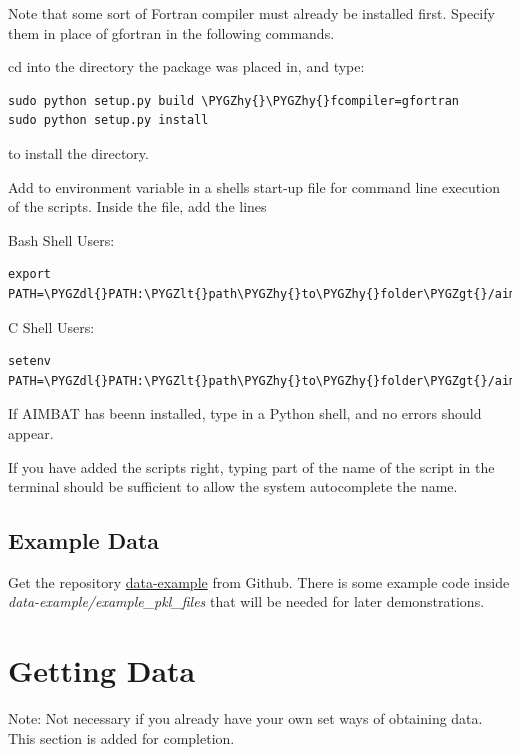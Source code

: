 \documentclass[letterpaper,10pt,english]{sphinxmanual}
\def\PYGZlt{\char`\<}
\def\PYGZgt{\char`\>}
\def\PYGZdl{\char`\$}
\def\PYGZhy{\char`\-}
\begin{document}
Note that some sort of Fortran compiler must already be installed first. Specify them in place of gfortran in the following commands.

cd into the directory the  package was placed in, and type:

\begin{Verbatim}[commandchars=\\\{\}]
sudo python setup.py build \PYGZhy{}\PYGZhy{}fcompiler=gfortran
sudo python setup.py install
\end{Verbatim}

to install the  directory.

Add  to environment variable  in a shells start-up file for command line execution of the scripts. Inside the  file, add the lines

Bash Shell Users:

\begin{Verbatim}[commandchars=\\\{\}]
export PATH=\PYGZdl{}PATH:\PYGZlt{}path\PYGZhy{}to\PYGZhy{}folder\PYGZgt{}/aimbat/scripts
\end{Verbatim}

C Shell Users:

\begin{Verbatim}[commandchars=\\\{\}]
setenv PATH=\PYGZdl{}PATH:\PYGZlt{}path\PYGZhy{}to\PYGZhy{}folder\PYGZgt{}/aimbat/scripts
\end{Verbatim}

If AIMBAT has beenn installed, type  in a Python shell, and no errors should appear.

If you have added the scripts right, typing part of the name of the script in the terminal should be sufficient to allow the system autocomplete the name.


\section{Example Data}
\label{docfiles/install_aimbat:example-data}
Get the repository \href{https://github.com/pysmo/data-example}{data-example} from Github. There is some example code inside \emph{data-example/example\_pkl\_files} that will be needed for later demonstrations.


\chapter{Getting Data}
\label{docfiles/gettingData:getting-data}\label{docfiles/gettingData::doc}
Note: Not necessary if you already have your own set ways of obtaining data. This section is added for completion.
\end{document}
